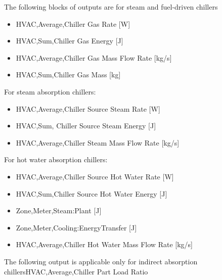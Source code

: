 The following blocks of outputs are for steam and fuel-driven chillers

\begin{itemize}
\item
  HVAC,Average,Chiller Gas Rate {[}W{]}
\item
  HVAC,Sum,Chiller Gas Energy {[}J{]}
\item
  HVAC,Average,Chiller Gas Mass Flow Rate {[}kg/s{]}
\item
  HVAC,Sum,Chiller Gas Mass {[}kg{]}
\end{itemize}

For steam absorption chillers:

\begin{itemize}
\item
  HVAC,Average,Chiller Source Steam Rate {[}W{]}
\item
  HVAC,Sum, Chiller Source Steam Energy {[}J{]}
\item
  HVAC,Average,Chiller Steam Mass Flow Rate {[}kg/s{]}
\end{itemize}

For hot water absorption chillers:

\begin{itemize}
\item
  HVAC,Average,Chiller Source Hot Water Rate {[}W{]}
\item
  HVAC,Sum,Chiller Source Hot Water Energy {[}J{]}
\item
  Zone,Meter,Steam:Plant {[}J{]}
\item
  Zone,Meter,Cooling:EnergyTransfer {[}J{]}
\item
  HVAC,Average,Chiller Hot Water Mass Flow Rate {[}kg/s{]}
\end{itemize}

The following output is applicable only for indirect absorption chillersHVAC,Average,Chiller Part Load Ratio

